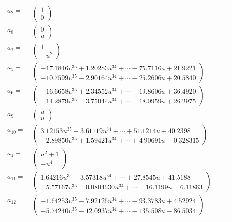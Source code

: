 \documentclass[1p]{elsarticle_modified}
\theoremstyle{definition}
\begin{document}
\begin{tabular}{m{7pt} m{180pt} m{7pt} m{180pt} }
\flushright $a_{2}=$&$\begin{pmatrix}1\\0\end{pmatrix}$ \\
\flushright $a_{8}=$&$\begin{pmatrix}0\\u\end{pmatrix}$ \\
\flushright $a_{3}=$&$\begin{pmatrix}1\\- u^2\end{pmatrix}$ \\
\flushright $a_{5}=$&$\begin{pmatrix}-17.1846 u^{35}+1.20283 u^{34}+\cdots-75.7116 u+21.9221\\-10.7599 u^{35}-2.90164 u^{34}+\cdots-25.2606 u+20.5840\end{pmatrix}$ \\
\flushright $a_{6}=$&$\begin{pmatrix}-16.6658 u^{35}+2.34552 u^{34}+\cdots-19.8606 u+36.4920\\-14.2879 u^{35}-3.75044 u^{34}+\cdots-18.0959 u+26.2975\end{pmatrix}$ \\
\flushright $a_{9}=$&$\begin{pmatrix}u\\u\end{pmatrix}$ \\
\flushright $a_{10}=$&$\begin{pmatrix}3.12153 u^{35}+3.61119 u^{34}+\cdots+51.1214 u+40.2398\\-2.89850 u^{35}+1.59421 u^{34}+\cdots+4.90691 u-0.328315\end{pmatrix}$ \\
\flushright $a_{1}=$&$\begin{pmatrix}u^2+1\\- u^4\end{pmatrix}$ \\
\flushright $a_{11}=$&$\begin{pmatrix}1.64216 u^{35}+3.57318 u^{34}+\cdots+27.8545 u+41.5188\\-5.57167 u^{35}-0.0804230 u^{34}+\cdots-16.1199 u-6.11863\end{pmatrix}$ \\
\flushright $a_{12}=$&$\begin{pmatrix}-1.64253 u^{35}-7.92125 u^{34}+\cdots-93.3783 u+4.52924\\-5.74240 u^{35}-12.0937 u^{34}+\cdots-135.508 u-86.5034\end{pmatrix}$ \\

\end{tabular}
\end{document}
